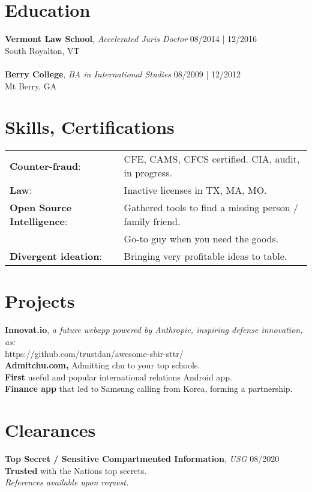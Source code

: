 \documentclass[line,margin]{res}
\begin{document}
\begin{resume}
	\section{Education}
	\textbf{Vermont Law School}, {\sl Accelerated Juris Doctor} \hfill 08/2014 | 12/2016\\South Royalton, VT\\\\
	\textbf{Berry College}, {\sl BA in International Studies} \hfill 08/2009 | 12/2012\\Mt Berry, GA
	\section{Skills, Certifications}
	\begin{tabular}{@{}ll}
		\textbf{Counter-fraud}:            & CFE, CAMS, CFCS certified.  CIA, audit, in progress. \\
		\textbf{Law}:                      & Inactive licenses in TX, MA, MO. \\
		\textbf{Open Source Intelligence}: & Gathered tools to find a missing person / family friend. \\ 
		                                   & Go-to guy when you need the goods. \\
		\textbf{Divergent ideation}:       & Bringing very profitable ideas to table. \\
	\end{tabular}
	\section{Projects}
	\textbf{Innovat.io}, {\sl a future webapp powered by Anthropic, inspiring defense innovation, as:}\\ 
	\textnormal https://github.com/trustdan/awesome-sbir-sttr/\\
	\textbf {Admitchu.com,} \textquotedbl{}Admitting chu to your top schools.\textquotedbl{} \\
	\textbf {First} useful and popular international relations Android app. \\ 
	\textbf {Finance app} that led to Samsung calling from Korea, forming a partnership. \\
	\section{Clearances}
	\textbf{Top Secret / Sensitive Compartmented Information}, {\sl USG} \hfill 08/2020 \\
	\textbf{Trusted} with the Nation\textquotesingle{}s top secrets. \\
	
	\hfill{\sl References available upon request.} \\
\end{resume}
\end{document}
